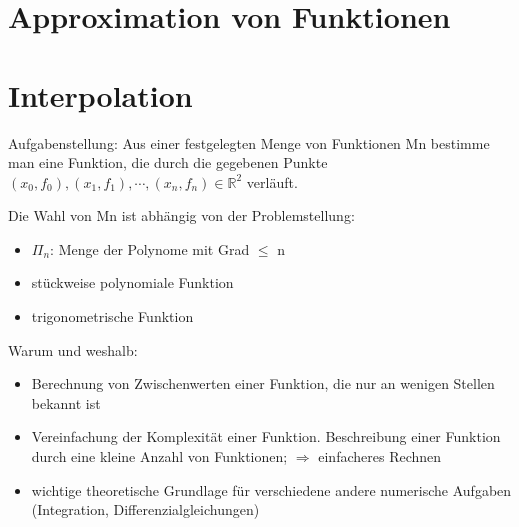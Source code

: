 \section{Approximation von Funktionen}
\section{Interpolation}
Aufgabenstellung: Aus einer festgelegten Menge von Funktionen Mn 
bestimme man eine Funktion, die durch die gegebenen Punkte
$(x_0, f_0), (x_1, f_1), \cdots, (x_n, f_n) \in \mathbb{R}^2$ verläuft.

Die Wahl von Mn ist abhängig von der Problemstellung:
\begin{itemize}
  \item $\Pi_n$: Menge der Polynome mit Grad $\leq$ n
  \item stückweise polynomiale Funktion
  \item trigonometrische Funktion
\end{itemize}
Warum und weshalb:
\begin{itemize}
  \item Berechnung von Zwischenwerten einer Funktion, die nur an wenigen 
    Stellen bekannt ist
  \item Vereinfachung der Komplexität einer Funktion. Beschreibung
    einer Funktion durch eine kleine Anzahl von Funktionen; $\Rightarrow$
    einfacheres Rechnen
  \item wichtige theoretische Grundlage für verschiedene andere numerische
    Aufgaben (Integration, Differenzialgleichungen)
\end{itemize}

